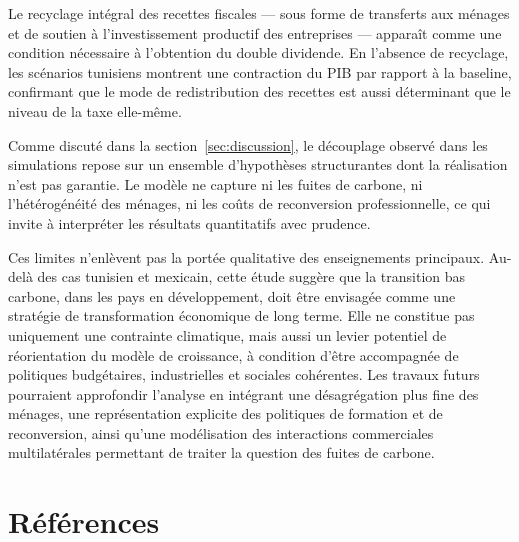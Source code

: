 \documentclass[12pt, a4paper]{article}
\begin{document}
Le recyclage intégral des recettes fiscales --- sous forme de transferts aux ménages et de soutien à l'investissement productif des entreprises --- apparaît comme une condition nécessaire à l'obtention du double dividende. En l'absence de recyclage, les scénarios tunisiens montrent une contraction du PIB par rapport à la baseline, confirmant que le mode de redistribution des recettes est aussi déterminant que le niveau de la taxe elle-même.

Comme discuté dans la section~\ref{sec:discussion}, le découplage observé dans les simulations repose sur un ensemble d'hypothèses structurantes dont la réalisation n'est pas garantie. Le modèle ne capture ni les fuites de carbone, ni l'hétérogénéité des ménages, ni les coûts de reconversion professionnelle, ce qui invite à interpréter les résultats quantitatifs avec prudence.

Ces limites n'enlèvent pas la portée qualitative des enseignements principaux. Au-delà des cas tunisien et mexicain, cette étude suggère que la transition bas carbone, dans les pays en développement, doit être envisagée comme une stratégie de transformation économique de long terme. Elle ne constitue pas uniquement une contrainte climatique, mais aussi un levier potentiel de réorientation du modèle de croissance, à condition d'être accompagnée de politiques budgétaires, industrielles et sociales cohérentes. Les travaux futurs pourraient approfondir l'analyse en intégrant une désagrégation plus fine des ménages, une représentation explicite des politiques de formation et de reconversion, ainsi qu'une modélisation des interactions commerciales multilatérales permettant de traiter la question des fuites de carbone.

\newpage
\section*{Références}
\end{document}
